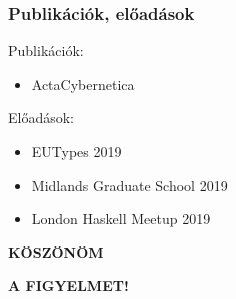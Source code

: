 \documentclass[bigger]{beamer}
\begin{document}
\begin{frame}[fragile]
	\frametitle{Publikációk, előadások}
	\begin{vfitemize}
		\item Publikációk:
		\begin{itemize}
			\item ActaCybernetica
		\end{itemize}
		\item Előadások:
		\begin{itemize}
			\item EUTypes 2019
			\item Midlands Graduate School 2019
			\item London Haskell Meetup 2019
		\end{itemize}
	\end{vfitemize}
\end{frame}


{
	\begin{frame}{}
	
	\bigskip\bigskip\bigskip
	
	{\bf\Huge\color{white} KÖSZÖNÖM}

	
	\bigskip
	
	{\bf\Huge\color{white} A FIGYELMET!}
	
\end{frame}
}

\end{document}
